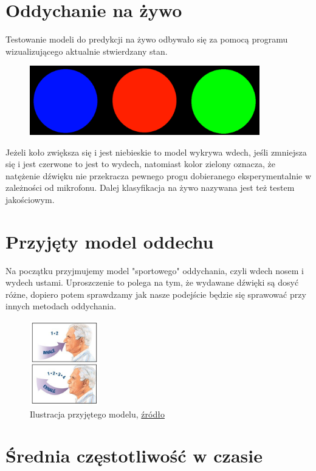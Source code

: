 \documentclass[polish]{article}
\begin{document}
\section{Oddychanie na żywo}
Testowanie modeli do predykcji na żywo odbywało się za pomocą programu wizualizującego aktualnie
stwierdzany stan. 
\begin{figure}[H]
	\centering
	\includegraphics[width=10cm]{wdechwydechcisza}
\end{figure}
Jeżeli koło zwiększa się i jest niebieskie to model wykrywa wdech, jeśli zmniejsza się i jest
czerwone to jest to wydech, natomiast kolor zielony oznacza, że natężenie dźwięku nie przekracza pewnego 
progu dobieranego eksperymentalnie w zależności od mikrofonu.
Dalej klasyfikacja na żywo nazywana jest też testem jakościowym.
\section{Przyjęty model oddechu}
Na początku przyjmujemy model "sportowego" oddychania, czyli wdech nosem i wydech ustami.
Uproszczenie to polega na tym, że wydawane dźwięki są dosyć różne, dopiero potem sprawdzamy jak nasze podejście będzie się sprawować
przy innych metodach oddychania.
\begin{figure}[H]
	\centering
	\includegraphics[width=3cm]{model_oddechu}
  	\caption{Ilustracja przyjętego modelu,  \href{https://www.quora.com/Should-I-exhale-from-the-mouth-or-nose-while-deep-breathing}{źródło}}
\end{figure}
\section{Średnia częstotliwość w czasie}
\end{document}
